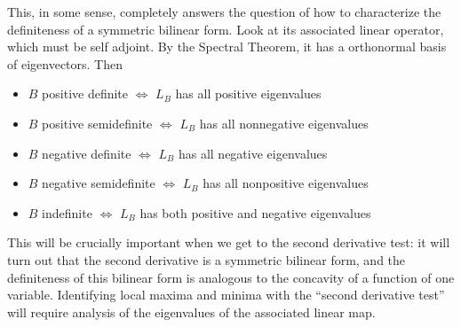 \documentclass{ximera}
\begin{document}
This, in some sense, completely answers the question of how to characterize the definiteness of a symmetric bilinear form.  Look at its associated linear operator, 
which must be self adjoint.  By the Spectral Theorem, it has a orthonormal basis of eigenvectors.  Then 

\begin{itemize}
	\item $B$ positive definite $\Longleftrightarrow$ $L_B$ has all positive eigenvalues
	\item $B$ positive semidefinite $\Longleftrightarrow$ $L_B$ has all nonnegative eigenvalues
	\item $B$ negative definite $\Longleftrightarrow$ $L_B$ has all negative eigenvalues
	\item $B$ negative semidefinite $\Longleftrightarrow$ $L_B$ has all nonpositive eigenvalues
	\item $B$ indefinite $\Longleftrightarrow$ $L_B$ has both positive and negative eigenvalues
\end{itemize}

This will be crucially important when we get to the second derivative test:  it will turn out that the second derivative is a symmetric bilinear form, and the definiteness of this 
bilinear form is analogous to the concavity of a function of one variable.  Identifying local maxima and minima with the ``second derivative test'' will require analysis of the eigenvalues
of the associated linear map.
	
\end{document}
